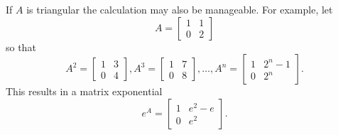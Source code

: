 \documentclass[../MathsNotesBase.tex]{subfiles}
\begin{document}
{	If $A$ is triangular the calculation may also be manageable. For example, let
	\[ A = 	\begin{bmatrix}
		1 & 1\\
		0 & 2
	\end{bmatrix} 
	\]
	so that
	\[ A^2 =\begin{bmatrix}
		1 & 3\\
		0 & 4
	\end{bmatrix},
	A^3 =\begin{bmatrix}
		1 & 7\\
		0 & 8
	\end{bmatrix}, \dots,
	A^n =\begin{bmatrix}
		1 & 2^n - 1\\
		0 & 2^n
	\end{bmatrix}.
	\]
	This results in a matrix exponential
	\[ e^A =\begin{bmatrix}
		1 & e^2 - e\\
		0 & e^2
	\end{bmatrix}.
	\]
}
\end{document}
